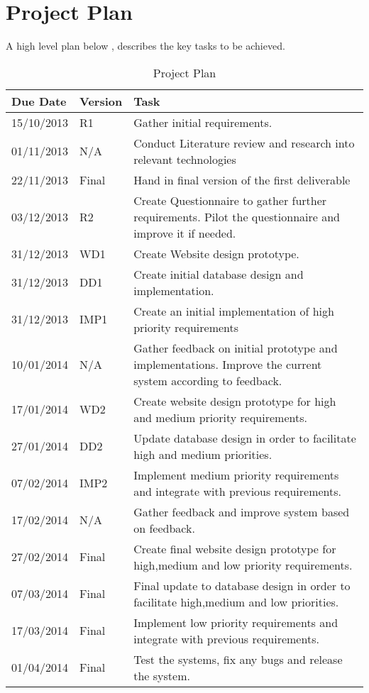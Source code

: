 \documentclass[a4paper,oneside,11pt]{report}
\begin{document}
\chapter{Project Plan}
A high level plan below , describes the key tasks to be achieved.
\begin{center}
	\begin{table}[!ht]
    \begin{tabular}[ht]{| l | l | p{9cm} |}
    \hline
    Due Date & Version & Task \\ 
    \hline
    15/10/2013 & R1 & Gather initial requirements.\\ 
    \hline
    01/11/2013 & N/A & Conduct Literature review and research into relevant 												  technologies \\ 
    \hline
    22/11/2013 & Final & Hand in final version of the first deliverable \\ 
    \hline
    03/12/2013 & R2 & Create Questionnaire to gather further requirements. Pilot the 										questionnaire and improve it if needed.\\ 
    \hline
    31/12/2013 & WD1 & Create Website design prototype.\\
    \hline
    31/12/2013 & DD1 & Create initial database design and implementation.\\
    \hline
    31/12/2013 & IMP1 & Create an initial implementation of high priority requirements\\
    \hline
    10/01/2014 & N/A & Gather feedback on initial prototype and implementations. Improve 	                  				   the current system according to feedback.\\
    \hline
     17/01/2014 & WD2 & Create website design prototype for high and medium priority 										  requirements.\\
    \hline
    27/01/2014 & DD2 & Update database design in order to facilitate high and medium 		 								 priorities.\\
    \hline
    07/02/2014 & IMP2 & Implement medium priority requirements and integrate with previous requirements.		\\
    \hline
    17/02/2014 & N/A & Gather feedback and improve system based on feedback.\\
    \hline
    27/02/2014 & Final & Create final website design prototype for high,medium and low priority 			 			 requirements.\\
    \hline
    07/03/2014 & Final & Final update to database design in order to facilitate high,medium and low		 		             priorities.\\
    \hline
    17/03/2014 & Final & Implement low priority requirements and integrate with previous requirements.\\
    \hline
    01/04/2014 & Final & Test the systems, fix any bugs and release the system.\\
    \hline
    \end{tabular}
    \caption{Project Plan}
\label{tab:test}
    \end{table}
    \end{center}

\printbibliography
\end{document}
